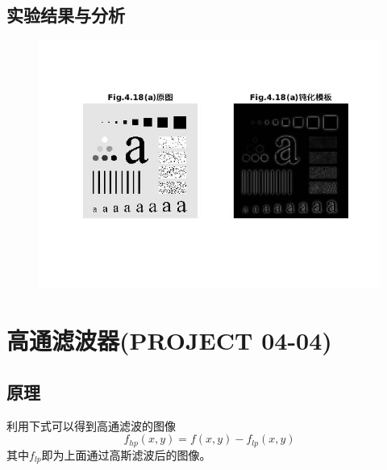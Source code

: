 \documentclass[logo,reportComp]{thesis}
\begin{document}
\subsection{实验结果与分析}
\begin{figure}[H]
\centering
\includegraphics[width=\linewidth]{fig/03.jpg}
\end{figure}

\section{高通滤波器(PROJECT 04-04)}
\subsection{原理}
利用下式可以得到高通滤波的图像
\[f_{hp}(x,y)=f(x,y)-f_{lp}(x,y)\]
其中$f_{lp}$即为上面通过高斯滤波后的图像。
\end{document}

